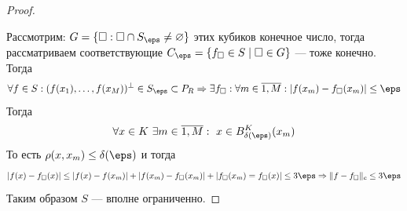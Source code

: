 \begin{proof}
\begin{figure}[h!]
		\caption{}
		\label{fig:screenshot001}
	\end{figure}
Рассмотрим: $G = \{\square : \square \cap S_\eps \neq \varnothing \}$ этих кубиков конечное число, тогда рассматриваем соответствующие $C_\eps = \{f_\square \in S \mid \square \in G\}$ --- тоже конечно. Тогда
$$
\forall f \in S: (f(x_1), \dots, f(x_M))^\perp \in S_\eps \subset P_R \Rightarrow \exists f_\square: \forall m \in \overline{1, M}: |f(x_m) - f_\square(x_m)| \leq \eps
$$
Тогда 
$$\forall x \in K 	\ \exists m \in \overline{1, M}: \ x \in B_{\delta(\eps)}^K(x_m)$$
То есть $\rho(x,x_m) \leq \delta(\eps)$ и тогда
$$
|f(x) - f_\square(x)| \leq |f(x) - f(x_m)| + |f(x_m) - f_\square(x_m)| + |f_\square(x_m) = f_\square(x)| \leq 3\eps \Rightarrow \|f - f_\square\|_c \leq 3\eps
$$
Таким образом $S$ --- вполне ограниченно. 
\end{proof}